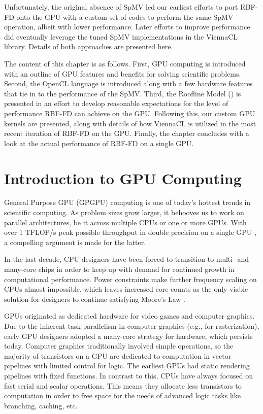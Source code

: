 \documentclass{report}
\begin{document}
Unfortunately, the original absence of SpMV led our earliest efforts to port RBF-FD onto the GPU with a custom set of codes to perform the same SpMV operation, albeit with lower performance. Later efforts to improve performance did eventually leverage the tuned SpMV implementations in the ViennaCL library. Details of both approaches are presented here. 

The content of this chapter is as follows. First, GPU computing is introduced with an outline of GPU features and benefits for solving scientific problems. Second, the OpenCL language is introduced along with a few hardware features that tie in to the performance of the SpMV. Third, the Roofline Model (\cite{Williams2009}) is presented in an effort to develop reasonable  expectations for the level of performance RBF-FD can achieve on the GPU. Following this, our custom GPU kernels are presented, along with details of how ViennaCL is utilized in the most recent iteration of RBF-FD on the GPU. Finally, the chapter concludes with a look at the actual performance of RBF-FD on a single GPU. 

\section{Introduction to GPU Computing} 
General Purpose GPU (GPGPU) computing is one of today's hottest trends in scientific computing. As problem sizes grow larger, it behooves us to work on parallel architectures, be it across multiple CPUs or one or more GPUs. With over 1 TFLOP/s peak possible throughput in double precision on a single GPU \cite{KeplerFactSheet}, a compelling argument is made for the latter. 

In the last decade, CPU designers have been forced to transition to multi- and many-core chips in order to keep up with demand for continued growth in computational performance. Power constraints make further frequency scaling on CPUs almost impossible, which leaves increased core counts as the only viable solution for designers to continue satisfying Moore's Law \cite{Owens2007}. 


GPUs originated as dedicated hardware for video games and computer graphics. 
Due to the inherent task parallelism in computer graphics  (e.g., for rasterization), early GPU designers adopted a many-core strategy for hardware, which persists today. Computer graphics traditionally involved simple operations, so the majority of transistors on a GPU are dedicated to computation in vector pipelines with limited control for logic. The earliest GPUs had static rendering pipelines with fixed functions. In contrast to this, CPUs have always focused on fast serial and scalar operations. This means they allocate less transistors to computation in order to free space for the needs of advanced logic tasks like branching, caching, etc. \cite{Owens2007,CudaGuide2013}. %
\end{document}
